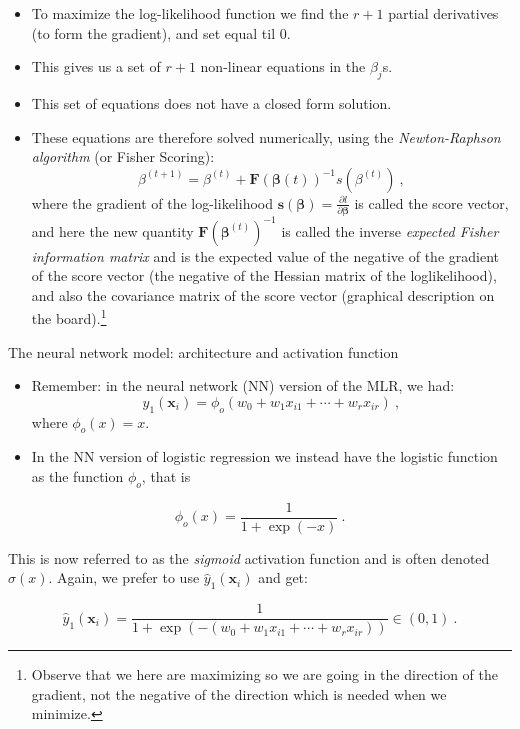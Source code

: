 \documentclass[10pt,ignorenonframetext,]{beamer}
\providecommand{\tightlist}{%
  \setlength{\itemsep}{0pt}\setlength{\parskip}{0pt}}
\begin{document}
\begin{frame}

\begin{itemize}
\tightlist
\item
  To maximize the log-likelihood function we find the \(r+1\) partial
  derivatives (to form the gradient), and set equal til 0.
\item
  This gives us a set of \(r+1\) non-linear equations in the
  \(\beta_j\)s.
\item
  This set of equations does not have a closed form solution.
\item
  These equations are therefore solved numerically, using the
  \emph{Newton-Raphson algorithm} (or Fisher Scoring):
  \[\beta^{(t+1)}=\beta^{(t)} + {\boldsymbol F}({\boldsymbol \beta}{(t)})^{-1} s(\beta^{(t)}) \ ,\]
  where the gradient of the log-likelihood
  \({\boldsymbol s}({\boldsymbol \beta})=\frac{\partial l}{\partial \boldsymbol \beta}\)
  is called the score vector, and here the new quantity
  \({\boldsymbol F}({\boldsymbol \beta}^{(t)})^{-1}\) is called the
  inverse \emph{expected Fisher information matrix} and is the expected
  value of the negative of the gradient of the score vector (the
  negative of the Hessian matrix of the loglikelihood), and also the
  covariance matrix of the score vector (graphical description on the
  board).\footnote{Observe that we here are maximizing so we are going in the direction of the gradient, not the negative of the direction which is needed when we minimize.}
\end{itemize}

\end{frame}

\begin{frame}

\begin{block}{The neural network model: architecture and activation
function}

\vspace{2mm}

\begin{itemize}
\item
  Remember: in the neural network (NN) version of the MLR, we had:
  \[ y_1({\boldsymbol x}_i)=\phi_o(w_0+w_1 x_{i1}+\cdots + w_r x_{ir}) \ , \]
  where \(\phi_o(x)=x\).
\item
  In the NN version of logistic regression we instead have the logistic
  function as the function \(\phi_o\), that is
\end{itemize}

\[ \phi_o(x)=\frac{1}{1+\exp(-x)} \ .\]

This is now referred to as the \emph{sigmoid} activation function and is
often denoted \(\sigma(x)\). Again, we prefer to use
\(\hat{y}_1({\boldsymbol x}_i)\) and get:

\[ \hat{y}_1({\boldsymbol x}_i)=\frac{1}{1+\exp(-(w_0+w_1 x_{i1}+\cdots + w_r x_{ir}))} \in (0,1) \ . \]

\end{block}

\end{frame}
\end{document}
